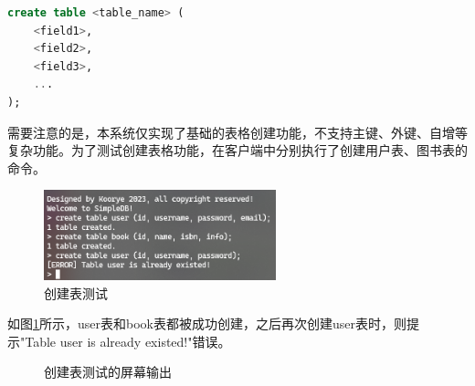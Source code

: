 \begin{lstlisting}[language=sql]
create table <table_name> (
    <field1>,
    <field2>,
    <field3>,
    ...
);
\end{lstlisting}

需要注意的是，本系统仅实现了基础的表格创建功能，不支持主键、外键、自增等复杂功能。为了测试创建表格功能，在客户端中分别执行了创建用户表、图书表的命令。

\begin{figure}[H]
    \includegraphics[width=0.6\textwidth]{examples/创建表.png}
    \centering
    \caption{创建表测试}
    \label{fig:test-create}
\end{figure}

如图\ref{fig:test-create}所示，user表和book表都被成功创建，之后再次创建user表时，则提示"Table user is already existed!"错误。

\begin{figure}[H]
    \centering
    \caption{创建表测试的屏幕输出}
    \label{fig:test-create-log}
\end{figure}

